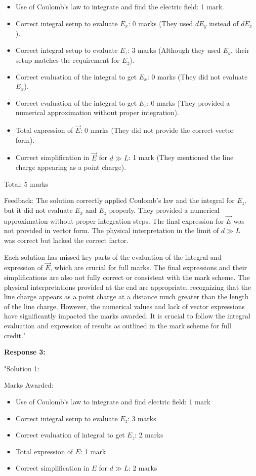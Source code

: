 \documentclass[a4paper,11pt]{article}
\begin{document}
\begin{itemize}
  \item Use of Coulomb's law to integrate and find the electric field: 1 mark.
  \item Correct integral setup to evaluate \( E_x \): 0 marks (They used \( dE_y \) instead of \( dE_x \)).
  \item Correct integral setup to evaluate \( E_z \): 3 marks (Although they used \( E_y \), their setup matches the requirement for \( E_z \)).
  \item Correct evaluation of the integral to get \( E_x \): 0 marks (They did not evaluate \( E_x \)).
  \item Correct evaluation of the integral to get \( E_z \): 0 marks (They provided a numerical approximation without proper integration).
  \item Total expression of \( \vec{E} \): 0 marks (They did not provide the correct vector form).
  \item Correct simplification in \( \vec{E} \) for \( d \gg L \): 1 mark (They mentioned the line charge appearing as a point charge).
\end{itemize}

Total: 5 marks

Feedback: The solution correctly applied Coulomb's law and the integral for \( E_z \), but it did not evaluate \( E_x \) and \( E_z \) properly. They provided a numerical approximation without proper integration steps. The final expression for \( \vec{E} \) was not provided in vector form. The physical interpretation in the limit of \( d \gg L \) was correct but lacked the correct factor.

Each solution has missed key parts of the evaluation of the integral and expression of \( \vec{E} \), which are crucial for full marks. The final expressions and their simplifications are also not fully correct or consistent with the mark scheme. The physical interpretations provided at the end are appropriate, recognizing that the line charge appears as a point charge at a distance much greater than the length of the line charge. However, the numerical values and lack of vector expressions have significantly impacted the marks awarded. It is crucial to follow the integral evaluation and expression of results as outlined in the mark scheme for full credit."

\textbf{Response 3:}

"Solution 1:

Marks Awarded:
\begin{itemize}
  \item Use of Coulomb's law to integrate and find electric field: 1 mark
  \item Correct integral setup to evaluate \( E_z \): 3 marks
  \item Correct evaluation of integral to get \( E_z \): 2 marks
  \item Total expression of \( E \): 1 mark
  \item Correct simplification in \( E \) for \( d \gg L \): 2 marks
\end{itemize}
\end{document}
